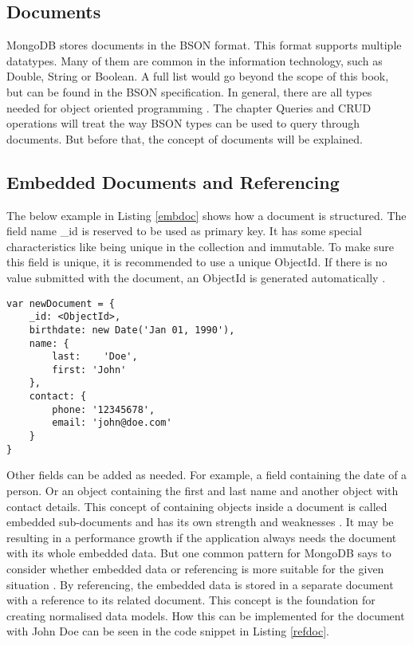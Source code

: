 \subsection{Documents}
MongoDB stores documents in the BSON format. This format supports multiple datatypes. Many of them are common in the information technology, such as Double, String or Boolean. A full list would go beyond the scope of this book, but can be found in the BSON specification. In general, there are all types needed for object oriented programming \cite{bsonspec}. The chapter Queries and CRUD operations will treat the way BSON types can be used to query through documents. But before that, the concept of documents will be explained.

\subsection{Embedded Documents and Referencing}
The below example in Listing \ref{embdoc} shows how a document is structured. The field name \_id is reserved to be used as primary key. It has some special characteristics like being unique in the collection and immutable. To make sure this field is unique, it is recommended to use a unique ObjectId. If there is no value submitted with the document, an ObjectId is generated automatically \cite{mdbdocu}. 

\begin{lstlisting}[frame=single, caption=Embedded Documents, label=embdoc]
var newDocument = {
	_id: <ObjectId>,
	birthdate: new Date('Jan 01, 1990'), 
	name: { 
        last:	 'Doe', 
        first: 'John' 
    },
	contact: {
		phone: '12345678',
		email: 'john@doe.com'
	}
}
\end{lstlisting}

Other fields can be added as needed. For example, a field containing the date of a person. Or an object containing the first and last name and another object with contact details. This concept of containing objects inside a document is called embedded sub-documents and has its own strength and weaknesses \cite{mdbdocu}. It may be resulting in a performance growth if the application always needs the document with its whole embedded data. But one common pattern for MongoDB says to consider whether embedded data or referencing is more suitable for the given situation \cite{Banker2016}. By referencing, the embedded data is stored in a separate document with a reference to its related document. This concept is the foundation for creating normalised data models. How this can be implemented for the document with John Doe can be seen in the code snippet in Listing \ref{refdoc}.

